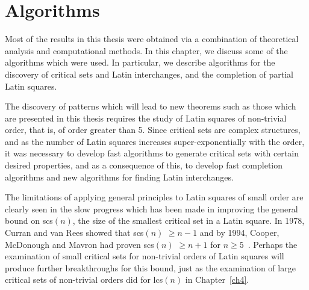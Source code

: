 \documentclass[12pt]{report}
\def\lcs#1{{\rm lcs}$(#1)$}
\def\scs#1{{\rm scs}$(#1)$}
\begin{document}
\chapter{Algorithms}\label{ch3}
%
%
%

Most of the results in this thesis were obtained via a combination
of theoretical analysis and computational methods.  In this chapter,
we discuss some of the algorithms which were used.  In particular,
we describe algorithms for the discovery of critical sets and 
Latin interchanges, and the completion of partial Latin squares. 

The discovery of patterns which will lead to new theorems such as those
which are presented in this thesis requires the study of Latin squares
of non-trivial order, that is, of order greater than 5.  Since critical
sets are complex structures, and as the number of Latin squares increases
super-exponentially with the order, it was necessary to develop fast
algorithms to generate critical sets with certain desired properties,
and as a consequence of this, to develop fast completion algorithms and
new algorithms for finding Latin interchanges.

The limitations of applying general principles to Latin squares of small
order are clearly seen in the slow progress which has been made in
improving the general bound on \scs{n}, the size of the
smallest critical set in a Latin square.  In 1978, Curran and van Rees
\cite{MR80j:05022} showed that \scs{n} $\geq n-1$ and by 1994, Cooper,
McDonough and Mavron had proven \scs{n} $\geq n+1$ for $n \geq 
5$~\cite{MR95h:05032}.  Perhaps the examination of small critical sets
for non-trivial orders of Latin squares will produce further breakthroughs
for this bound, just as the examination of large critical sets of non-trivial 
orders did for \lcs{n} in Chapter~\ref{ch4}.
\end{document}
